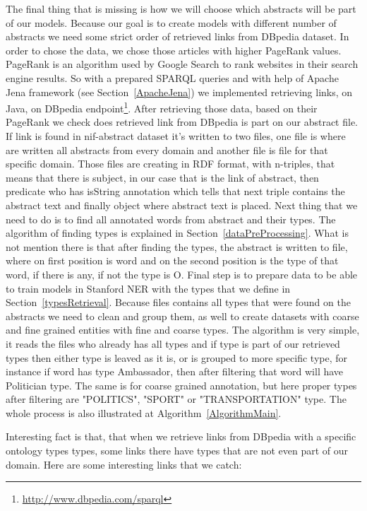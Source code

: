 \documentclass[thesis=M,english]{FITthesis}[2018/05/30]
\begin{document}
	The final thing that is missing is how we will choose which abstracts will be part of our models. Because our goal is to create models with different number of abstracts we need some strict order of retrieved links from DBpedia dataset. In order to chose the data, we chose those articles with higher PageRank values. PageRank \cite{wiki:PR} is an algorithm used by Google Search to rank websites in their search engine results. So with a prepared SPARQL queries and with help of Apache Jena framework (see Section~\ref{ApacheJena}) we implemented retrieving links, on Java, on DBpedia endpoint\footnote{\url{http://www.dbpedia.com/sparql}}. After retrieving those data, based on their PageRank we check does retrieved link from DBpedia is part on our abstract file. If link is found in nif-abstract dataset it's written to two files, one file is where are written all abstracts from every domain and another file is file for that specific domain. Those files are creating in RDF format, with n-triples, that means that there is subject, in our case that is the link of abstract, then predicate who has isString annotation which tells that next triple contains the abstract text and finally object where abstract text is placed. Next thing that we need to do is to find all annotated words from abstract and their types. The algorithm of finding types is explained in Section~\ref{dataPreProcessing}. What is not mention there is that after finding the types, the abstract is written to file, where on first position is word and on the second position is the type of that word, if there is any, if not the type is O. Final step is to prepare data to be able to train models in Stanford NER with the types that we define in Section~\ref{typesRetrieval}. Because files contains all types that were found on the abstracts we need to clean and group them, as well to create datasets with coarse and fine grained entities with fine and coarse types. The algorithm is very simple, it reads the files who already has all types and if type is part of our retrieved types then either type is leaved as it is, or is grouped to more specific type, for instance if word has type Ambassador, then after filtering that word will have Politician type. The same is for coarse grained annotation, but here proper types after filtering are "POLITICS", "SPORT" or "TRANSPORTATION" type. The whole process is also illustrated at Algorithm~\ref{AlgorithmMain}.
	
		Interesting fact is that, that when we retrieve links from DBpedia with a specific ontology types types, some links there have types that are not even part of our domain. Here are some interesting links that we catch:
	
\end{document}
